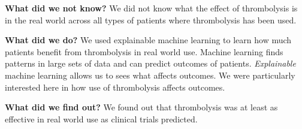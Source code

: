 \textbf{What did we not know?} We did not know what the effect of thrombolysis is in the real world across all types of patients where thrombolysis has been used. 

\textbf{What did we do?} We used explainable machine learning to learn how much patients benefit from thrombolysis in real world use. Machine learning finds patterns in large sets of data and can predict outcomes of patients. \textit{Explainable} machine learning allows us to sees what affects outcomes. We were particularly interested here in how use of thrombolysis affects outcomes.

\textbf{What did we find out?} We found out that thrombolysis was at least as effective in real world use as clinical trials predicted.


